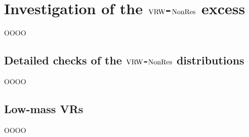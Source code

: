 \chapter[Investigation of the VRW-NonRes excess]{Investigation of the $\mathrm{VRW}$-$\mathrm{NonRes}$ excess}
\label{app:appendix-5}

OOOO

\section[Detailed distribution checks]{Detailed checks of the $\mathrm{VRW}$-$\mathrm{NonRes}$ distributions}
\label{heading:Appendix-Appendix5-2}

OOOO

\section[Low-mass VRs]{Low-mass VRs}
\label{heading:Appendix-Appendix5-3}

OOOO

